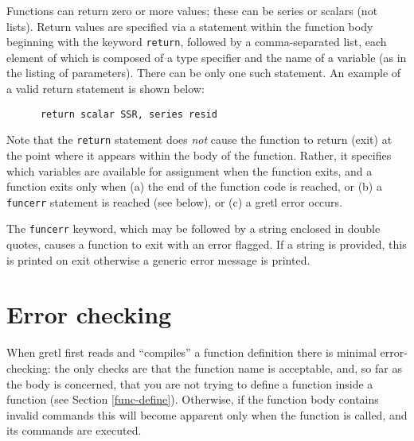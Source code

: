       Functions can return zero or more values; these can be series or scalars
      (not lists).  Return values are specified via a statement within the
      function body beginning with the keyword \verb+return+,
      followed by a comma-separated list, each element of which is
      composed of a type specifier and the name of a variable (as in
      the listing of parameters).  There can be only one such
      statement.  An example of a valid return statement is shown below:
    
\begin{verbatim}
      return scalar SSR, series resid\end{verbatim}

      Note that the \verb+return+ statement does
      \emph{not} cause the function to return (exit) at the point
      where it appears within the body of the function. Rather, it specifies
      which variables are available for assignment when the function exits, and
      a function exits only when (a) the end of the function code is reached, or
      (b) a \verb+funcerr+ statement is reached (see below), or (c)
      a gretl error occurs.
    
      The \verb+funcerr+ keyword, which may be followed by
      a string enclosed in double quotes, causes a function to exit with
      an error flagged.  If a string is provided, this is printed on exit
      otherwise a generic error message is printed.  
    

\section{Error checking}
\label{func-errors}

When gretl first reads and ``compiles'' a function
      definition there is minimal error-checking: the only checks are that the
      function name is acceptable, and, so far as the body is concerned, that
      you are not trying to define a function inside a function (see Section \ref{func-define}). Otherwise, if the function body contains
      invalid commands this will become apparent only when the function is
      called, and its commands are executed.
    


